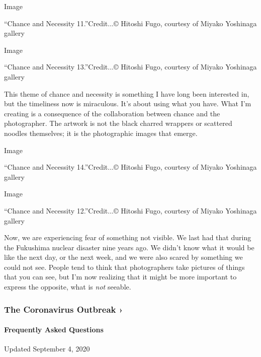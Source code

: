 Image

``Chance and Necessity 11.''Credit...© Hitoshi Fugo, courtesy of Miyako
Yoshinaga gallery

Image

``Chance and Necessity 13.''Credit...© Hitoshi Fugo, courtesy of Miyako
Yoshinaga gallery

This theme of chance and necessity is something I have long been
interested in, but the timeliness now is miraculous. It's about using
what you have. What I'm creating is a consequence of the collaboration
between chance and the photographer. The artwork is not the black
charred wrappers or scattered noodles themselves; it is the photographic
images that emerge.

Image

``Chance and Necessity 14.''Credit...© Hitoshi Fugo, courtesy of Miyako
Yoshinaga gallery

Image

``Chance and Necessity 12.''Credit...© Hitoshi Fugo, courtesy of Miyako
Yoshinaga gallery

Now, we are experiencing fear of something not visible. We last had that
during the Fukushima nuclear disaster nine years ago. We didn't know
what it would be like the next day, or the next week, and we were also
scared by something we could not see. People tend to think that
photographers take pictures of things that you can see, but I'm now
realizing that it might be more important to express the opposite, what
is \emph{not} seeable.

\href{https://www.nytimes3xbfgragh.onion/news-event/coronavirus?action=click\&pgtype=Article\&state=default\&region=MAIN_CONTENT_3\&context=storylines_faq}{}

\hypertarget{the-coronavirus-outbreak-}{%
\subsubsection{The Coronavirus Outbreak
›}\label{the-coronavirus-outbreak-}}

\hypertarget{frequently-asked-questions}{%
\paragraph{Frequently Asked
Questions}\label{frequently-asked-questions}}

Updated September 4, 2020

